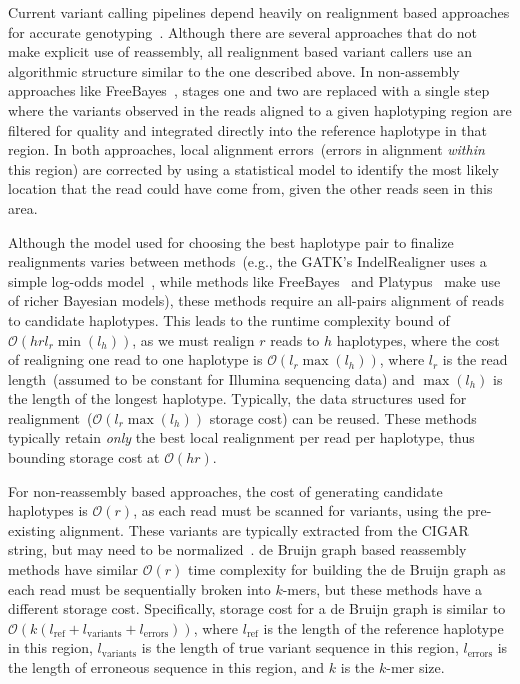 \documentclass[phd]{ucbthesis}
\begin{document}
Current variant calling pipelines depend heavily on realignment based approaches for accurate
genotyping~\cite{li14}. Although there are several approaches that do not make explicit use of reassembly,
all realignment based variant callers use an algorithmic structure similar to the one described
above. In non-assembly approaches like {FreeBayes}~\cite{garrison12}, stages
one and two are replaced with a single step where the variants observed in the reads aligned to a given
haplotyping region are filtered for quality and integrated directly into the reference haplotype in that region.
In both approaches, local alignment errors~(errors in alignment \emph{within} this region) are corrected
by using a statistical model to identify the most likely location that the read could have come from, given
the other reads seen in this area.

Although the model used for choosing the best haplotype pair to finalize realignments varies between
methods~(e.g., the GATK's {IndelRealigner} uses a simple log-odds model~\cite{depristo11}, while
methods like {FreeBayes}~\cite{garrison12} and {Platypus}~\cite{rimmer14} make use of richer
Bayesian models), these methods require an all-pairs alignment of reads to candidate
haplotypes. This leads to the runtime complexity bound of $\mathcal{O}(h r l_r \min(l_h))$,
as we must realign $r$ reads to $h$ haplotypes, where the cost of realigning
one read to one haplotype is $\mathcal{O}(l_r \max(l_h))$, where $l_r$ is the read length~(assumed to be
constant for Illumina sequencing data) and $\max(l_h)$ is the length of the longest haplotype. Typically,
the data structures used for realignment~($\mathcal{O}(l_r \max(l_h))$ storage cost) can be reused.
These methods typically retain \emph{only} the best local realignment per read per haplotype, thus
bounding storage cost at $\mathcal{O}(h r)$.

For non-reassembly based approaches, the cost of generating candidate haplotypes is $\mathcal{O}(r)$,
as each read must be scanned for variants, using the pre-existing alignment. These variants are typically
extracted from the CIGAR string, but may need to be normalized~\cite{li14}. de Bruijn graph based 
reassembly methods have similar $\mathcal{O}(r)$ time complexity for building the de Bruijn
graph as each read must be sequentially broken into $k$-mers, but these methods have a different
storage cost. Specifically, storage cost for a de Bruijn graph is similar to $\mathcal{O}(k
(l_{\text{ref}} + l_{\text{variants}} + l_{\text{errors}}))$, where $l_{\text{ref}}$ is the length of the reference
haplotype in this region, $l_{\text{variants}}$ is the length of true variant sequence in this region, 
$l_{\text{errors}}$ is the length of erroneous sequence in this region, and $k$ is the $k$-mer size.
\end{document}
